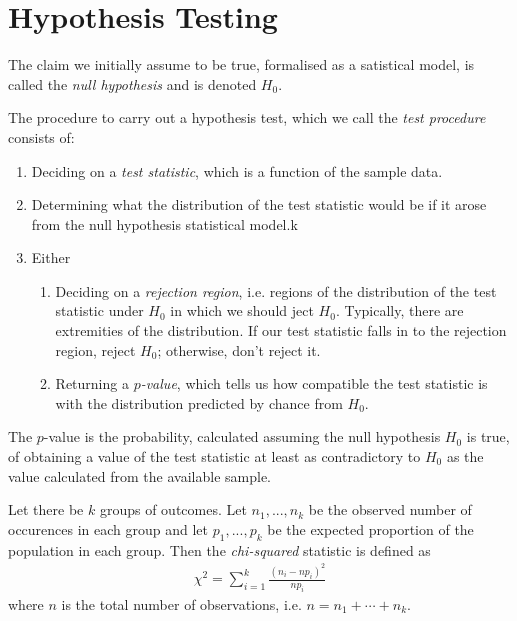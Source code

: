 \documentclass{article}
\begin{document}
\section{Hypothesis Testing}


\begin{definition}
	The claim we initially assume to be true, formalised as a satistical
	model, is called the \emph{null hypothesis} and is denoted $H_0$.
\end{definition}

\begin{definition}
	The procedure to carry out a hypothesis test, which we call the
	\emph{test procedure} consists of:
	\begin{enumerate}
		\item Deciding on a \emph{test statistic}, which is a function
			  of the sample data.
		\item Determining what the distribution of the test statistic would
			  be if it arose from the null hypothesis statistical model.k
		\item Either \begin{enumerate}
			\item Deciding on a \emph{rejection region}, i.e. regions of
				  the distribution of the test statistic under $H_0$ in
				  which we should ject $H_0$. Typically, there are extremities
				  of the distribution. If our test statistic falls in to the
				  rejection region, reject $H_0$; otherwise, don't reject it.
			\item Returning a \emph{$p$-value}, which tells us how compatible
				  the test statistic is with the distribution predicted by chance
				  from $H_0$.
		\end{enumerate}
	\end{enumerate}
\end{definition}

\begin{definition}
	The $p$-value is the probability, calculated assuming the null
	hypothesis $H_0$ is true, of obtaining a value of the test statistic
	at least as contradictory to $H_0$ as the value calculated from
	the available sample.
\end{definition}

\begin{definition}
	Let there be $k$ groups of outcomes. Let $n_1,...,n_k$ be the observed
	number of occurences in each group and let $p_1,...,p_k$ be the
	expected proportion of the population in each group. Then the
	\emph{chi-squared} statistic is defined as
	\begin{align*}
		\chi^2 = \sum_{i=1}^k \frac{(n_i-np_i)^2}{np_i}
	\end{align*}
	where $n$ is the total number of observations, i.e. $n=n_1+\cdots+n_k$.
\end{definition}
\end{document}
